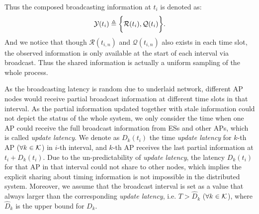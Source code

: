 Thus the composed broadcasting information at $t_i$ is denoted as:
\begin{align}
    \mathcal{Y}(t_i) \triangleq
        \bigg\{
            \mathcal{R}(t_i),
            \mathcal{Q}(t_i)
        \bigg\}.
\end{align}
And we notice that though $\mathcal{R}(t_{i,n})$ and $\mathcal{Q}(t_{i,n})$ also exists in each time slot, the observed information is only available at the start of each interval via broadcast. Thus the shared information is actually a uniform sampling of the whole process.

As the broadcasting latency is random due to underlaid network, different AP nodes would receive partial broadcast information at different time slots in that interval.
As the partial information updated together with stale information could not depict the status of the whole system, we only consider the time when one AP could receive the full broadcast information from ESs and other APs, which is called \emph{update latency}.
We denote as $D_{k}(t_i)$ the time \emph{update latency} for $k$-th AP ($\forall k\in\mathcal{K}$) in $i$-th interval, and $k$-th AP receives the last partial information at $t_{i} + D_{k}(t_i)$.
Due to the un-predictability of \emph{update latency}, the latency $D_{k}(t_i)$ for that AP in that interval could not share to other nodes, which implies the explicit sharing about timing information is not impossible in the distributed system.
Moreover, we assume that the broadcast interval is set as a value that always larger than the corresponding \emph{update latency}, i.e. $T > \hat{D}_k$ ($\forall k\in\mathcal{K}$), where $\hat{D}_k$ is the upper bound for $D_k$.

